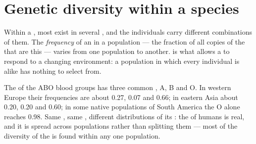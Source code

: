\section{Genetic diversity within a species}

\begin{proposition}\label{prop:g10:biodiversity-scales:genetic}
Within a , most  exist in several , and the
individuals carry different combinations of them. The
\emph{frequency} of an  in a population --- the fraction of all
copies of the  that are this  --- varies from one population
to another.  is what allows a  to respond to a
changing environment: a population in which every individual is alike
has nothing to select from.
\end{proposition}
\admitted

\begin{example}\label{ex:g10:biodiversity-scales:abo}
The  of the ABO blood groups has three common , A, B and O.
In western Europe their frequencies are about 0.27, 0.07 and 0.66; in
eastern Asia about 0.20, 0.20 and 0.60; in some native populations of
South America the O  alone reaches 0.98. Same , same
, different distributions of its : the  of
humans is real, and it is spread across populations rather than
splitting them --- most of the diversity of the  is found within
any one population.
\end{example}

